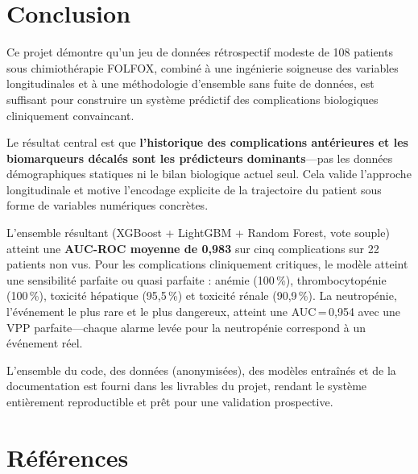\documentclass[12pt,a4paper]{report}
\begin{document}
\chapter{Conclusion}
\label{chap:conclusion}

Ce projet démontre qu'un jeu de données rétrospectif modeste de 108 patients sous chimiothérapie FOLFOX, combiné à une ingénierie soigneuse des variables longitudinales et à une méthodologie d'ensemble sans fuite de données, est suffisant pour construire un système prédictif des complications biologiques cliniquement convaincant.

Le résultat central est que \textbf{l'historique des complications antérieures et les biomarqueurs décalés sont les prédicteurs dominants}---pas les données démographiques statiques ni le bilan biologique actuel seul. Cela valide l'approche longitudinale et motive l'encodage explicite de la trajectoire du patient sous forme de variables numériques concrètes.

L'ensemble résultant (XGBoost + LightGBM + Random Forest, vote souple) atteint une \textbf{AUC-ROC moyenne de 0,983} sur cinq complications sur 22 patients non vus. Pour les complications cliniquement critiques, le modèle atteint une sensibilité parfaite ou quasi parfaite : anémie (100\,\%), thrombocytopénie (100\,\%), toxicité hépatique (95,5\,\%) et toxicité rénale (90,9\,\%). La neutropénie, l'événement le plus rare et le plus dangereux, atteint une AUC\,=\,0,954 avec une VPP parfaite---chaque alarme levée pour la neutropénie correspond à un événement réel.

L'ensemble du code, des données (anonymisées), des modèles entraînés et de la documentation est fourni dans les livrables du projet, rendant le système entièrement reproductible et prêt pour une validation prospective.

\chapter*{Références}
\end{document}
